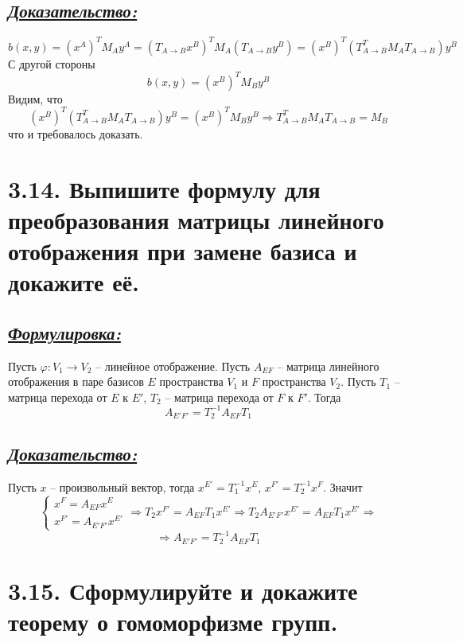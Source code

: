 \documentclass{article}
\begin{document}
\subsection*{\Large \underline{\textit{Доказательство: }}}
$$b(x, y) = (x^{A})^T M_A y^A = (T_{A \rightarrow B}x^{B})^T M_A (T_{A \rightarrow B} y^B) = 
(x^{B})^T (T_{A \rightarrow B}^T M_A T_{A \rightarrow B}) y^B$$
С другой стороны 
$$b(x, y) = (x^{B})^T M_B y^B$$
Видим, что 
$$
(x^{B})^T (T_{A \rightarrow B}^T M_A T_{A \rightarrow B}) y^B = (x^{B})^T M_B y^B \Rightarrow
T_{A \rightarrow B}^T M_A T_{A \rightarrow B} = M_B
$$
что и требовалось доказать.

\section*{\LARGE 3.14. Выпишите формулу для преобразования матрицы линейного отображения при замене базиса и докажите её. }
\subsection*{\Large \underline{\textit{Формулировка: }}}
Пусть $\varphi : V_1 \rightarrow V_2$ -- линейное отображение. Пусть $A_{EF}$ -- матрица линейного отображения в паре базисов $E$ пространства $V_1$ и $F$ пространства $V_2$. Пусть $T_1$ -- матрица перехода от $E$ к $E'$, $T_2$ --  матрица перехода от $F$ к $F'$. Тогда 
$$
A_{E'F'} = T_2^{-1}A_{EF}T_1
$$

\subsection*{\Large \underline{\textit{Доказательство: }}}
Пусть $x$ -- произвольный вектор, тогда $x^{E'} = T_1^{-1} x^E$, $x^{F'} = T_2^{-1} x^F$. Значит $$
\begin{cases}
x^{F} = A_{EF} x^{E} \\
x^{F'} = A_{E'F'} x^{E'}
\end{cases}
\Rightarrow
T_2 x^{F'} = A_{EF} T_1 x^{E'}
\Rightarrow
T_2 A_{E'F'} x^{E'} = A_{EF} T_1 x^{E'}
\Rightarrow
$$
$$
\Rightarrow
A_{E'F'} = T_2^{-1} A_{EF} T_1
$$

\section*{\LARGE 3.15. Сформулируйте и докажите теорему о гомоморфизме групп. }
\end{document}

